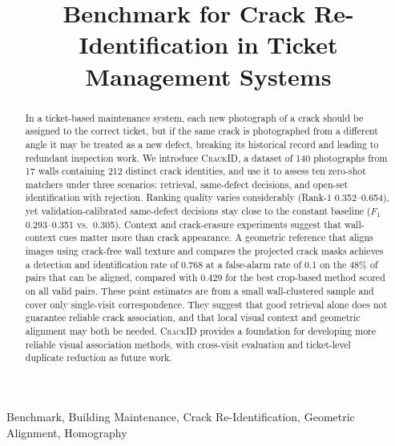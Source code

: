 \documentclass[conference,a4paper]{IEEEtran}
\begin{document}
\title{Benchmark for Crack Re-Identification in Ticket Management Systems}
\author{
}
\maketitle
\begin{abstract}
In a ticket-based maintenance system, each new photograph of a crack should be assigned to the correct ticket, but if the same crack is photographed from a different angle it may be treated as a new defect, breaking its historical record and leading to redundant inspection work.
We introduce \textsc{CrackID}, a dataset of 140 photographs from 17 walls containing 212 distinct crack identities, and use it to assess ten zero-shot matchers under three scenarios: retrieval, same-defect decisions, and open-set identification with rejection.
Ranking quality varies considerably (Rank-1 0.352--0.654), yet validation-calibrated same-defect decisions stay close to the constant baseline ($F_1$ 0.293--0.351 vs.~0.305).
Context and crack-erasure experiments suggest that wall-context cues matter more than crack appearance.
A geometric reference that aligns images using crack-free wall texture and compares the projected crack masks achieves a detection and identification rate of 0.768 at a false-alarm rate of 0.1 on the 48\% of pairs that can be aligned, compared with 0.429 for the best crop-based method scored on all valid pairs.
These point estimates are from a small wall-clustered sample and cover only single-visit correspondence.
They suggest that good retrieval alone does not guarantee reliable crack association, and that local visual context and geometric alignment may both be needed.
\textsc{CrackID} provides a foundation for developing more reliable visual association methods, with cross-visit evaluation and ticket-level duplicate reduction as future work.
\end{abstract}
\begin{IEEEkeywords}
Benchmark, Building Maintenance, Crack Re-Identification,
Geometric Alignment, Homography
\end{IEEEkeywords}









\end{document}
